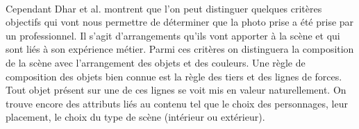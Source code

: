 \documentclass[11pt, french,screen]{report-rd-info}
\begin{document}
\paragraph*{}
Cependant Dhar et al. \cite{Dhar} montrent que l’on peut distinguer quelques critères objectifs qui vont nous permettre de déterminer que la photo prise a été prise par un professionnel. Il s’agit  d’arrangements qu’ils vont apporter à la scène et qui sont liés à son expérience métier. Parmi ces critères on distinguera la composition de la scène avec l'arrangement des objets et des couleurs. Une règle de composition des objets bien connue est la règle des tiers et des lignes de forces. Tout objet présent sur une de ces lignes se voit mis en valeur naturellement. On trouve encore des attributs liés au contenu tel que le choix des personnages, leur placement, le choix du type de scène (intérieur ou extérieur). 
\end{document}
